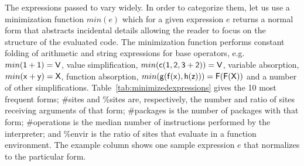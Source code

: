 \documentclass[review,screen,acmsmall,anonymous=true]{acmart}
\begin{document}
The expressions passed to \eval vary widely. In order to categorize them, let us
use a minimization function $min(e)$ which for a given expression $e$ returns a
normal form that abstracts incidental details allowing the reader to focus on
the structure of the evaluated code. The minimization function performs constant
folding of arithmetic and string expressions for base operators, e.g.
$min({\sf 1+1})={\sf V}$, value simplification, $min({\sf c(1,2,3+2)})={\sf V}$,
variable absorption, $min({\sf x+y})={\sf X}$, function absorption,
$min({\sf g(f(x),h(z))})={\sf F(F(X))}$ and a number of other simplifications.
Table~\ref{tab:minimizedexpressions} gives the 10 most frequent forms; \#sites
and \%sites are, respectively, the number and ratio of sites receiving arguments
of that form; \#packages is the number of packages with that form; \#operations
is the median number of instructions performed by the interpreter; and \%envir
is the ratio of sites that evaluate in a function environment. The example
column shows one sample expression $e$ that normalizes to the particular form.
\end{document}
